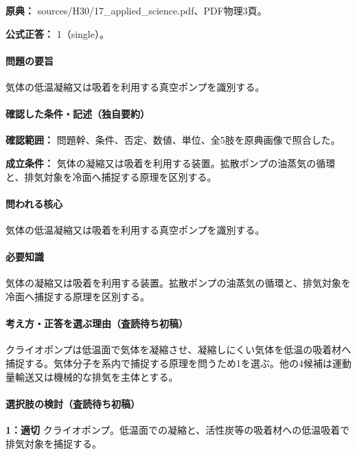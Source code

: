 \noindent\textbf{原典：} sources/H30/17\_applied\_science.pdf、PDF物理3頁。

\textbf{公式正答：} 1（single）。

\paragraph{問題の要旨} 気体の低温凝縮又は吸着を利用する真空ポンプを識別する。

\paragraph{確認した条件・記述（独自要約）}\mbox{}\par

\noindent\textbf{確認範囲：} 問題幹、条件、否定、数値、単位、全5肢を原典画像で照合した。\par

\noindent\textbf{成立条件：} 気体の凝縮又は吸着を利用する装置。拡散ポンプの油蒸気の循環と、排気対象を冷面へ捕捉する原理を区別する。\par

\paragraph{問われる核心} 気体の低温凝縮又は吸着を利用する真空ポンプを識別する。

\paragraph{必要知識} 気体の凝縮又は吸着を利用する装置。拡散ポンプの油蒸気の循環と、排気対象を冷面へ捕捉する原理を区別する。

\paragraph{考え方・正答を選ぶ理由（査読待ち初稿）} クライオポンプは低温面で気体を凝縮させ、凝縮しにくい気体を低温の吸着材へ捕捉する。気体分子を系内で捕捉する原理を問うため1を選ぶ。他の4候補は運動量輸送又は機械的な排気を主体とする。

\paragraph{選択肢の検討（査読待ち初稿）}\mbox{}\par

\noindent\textbf{1：適切} クライオポンプ。低温面での凝縮と、活性炭等の吸着材への低温吸着で排気対象を捕捉する。\par

